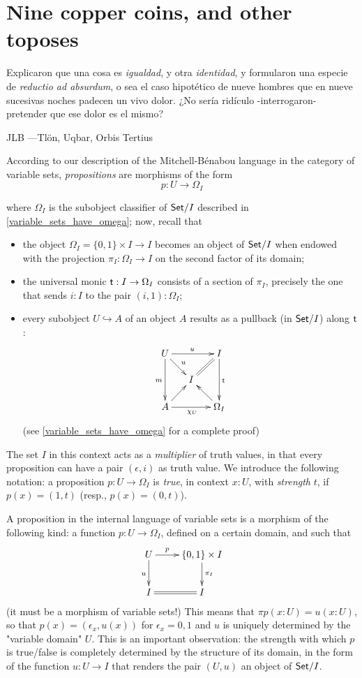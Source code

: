 \section{Nine copper coins, and other toposes}\label{sec_coins}
\epigraph{
	Explicaron que una cosa es \emph{igualdad}, y otra \emph{identidad}, y formularon una especie de \emph{reductio ad absurdum}, o sea el caso hipotético de nueve hombres que en nueve sucesivas noches padecen un vivo dolor. ¿No sería ridículo -interrogaron- pretender que ese dolor es el mismo?
}{JLB ---Tl\"on, Uqbar, Orbis Tertius}

According to our description of the Mitchell-Bénabou language in the category of variable sets, \emph{propositions} are morphisms of the form
\[p : U \to \Omega_I\]

where $\Omega_I$ is the subobject classifier of $\mathsf{Set}/I$ described in \autoref{variable_sets_have_omega}; now, recall that
\begin{itemize}
	\item the object $\Omega_I = \{0,1\}\times I \to I$ becomes an object of $\mathsf{Set}/I$ when endowed with the projection $\pi_I : \Omega_I \to I$ on the second factor of its domain;
	\item the universal monic $\textsf{t} : I \to \Omega_I$ consists of a section of $\pi_I$, precisely the one that sends $i : I$ to the pair $(i,1) : \Omega_I$;
	\item every subobject $U \hookrightarrow A$ of an object $A$ results as a pullback (in $\mathsf{Set}/I$) along $\textsf{t}$:
	      \[\xymatrix@R=5mm@C=5mm{
		      U\ar[dr]^u\ar[rr]^u\ar[dd]_m&& I\ar[dd]^{\tr} \ar@{=}[dl]\\
		      &I& \\
		      A \ar[ur]\ar[rr]_{\chi_U}&& \ar[ul]\Omega_I
		      }\]
	      (see \autoref{variable_sets_have_omega} for a complete proof)
\end{itemize}
The set $I$ in this context acts as a \emph{multiplier} of truth values, in that every proposition can have a pair $(\epsilon, i)$ as truth value. We introduce the following notation: a proposition $p : U \to \Omega_I$ is \emph{true}, in context $x :U$, with \emph{strength} $t$, if $p(x) =(1,t)$ (resp., $p(x)=(0,t)$).
\begin{remark}\label{very_importanta_force}
	A proposition in the internal language of variable sets is a morphism of the following kind: a function $p : U \to \Omega_I$, defined on a certain domain, and such that
	\[
		\xymatrix{
			U\ar[d]_u\ar[r]^-p  & \{0,1\}\times I \ar[d]^{\pi_I}\\
			I \ar@{=}[r]& I
		}
	\]
	(it must be a morphism of variable sets!) This means that $\pi p(x : U) = u(x : U)$, so that $p(x) = (\epsilon_x, u(x))$ for $\epsilon_x =0,1$ and $u$ is uniquely determined by the "variable domain" $U$. This is an important observation: the strength with which $p$ is true/false is completely determined by the structure of its domain, in the form of the function $u : U \to I$ that renders the pair $(U,u)$ an object of $\mathsf{Set}/I$.
\end{remark}
